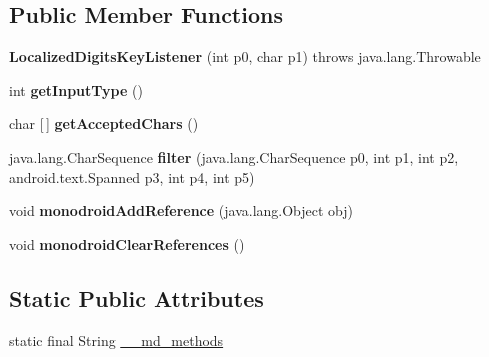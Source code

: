 \subsection*{Public Member Functions}
\begin{DoxyCompactItemize}
\item 
\mbox{\label{classmd5b60ffeb829f638581ab2bb9b1a7f4f3f_1_1LocalizedDigitsKeyListener_a6d87d28f4bbd94c7c2951d999a330b40}} 
{\bfseries Localized\+Digits\+Key\+Listener} (int p0, char p1)  throws java.\+lang.\+Throwable 	
\item 
\mbox{\label{classmd5b60ffeb829f638581ab2bb9b1a7f4f3f_1_1LocalizedDigitsKeyListener_ad2ee9df5ab9a58dc5587f8e51bc2ae86}} 
int {\bfseries get\+Input\+Type} ()
\item 
\mbox{\label{classmd5b60ffeb829f638581ab2bb9b1a7f4f3f_1_1LocalizedDigitsKeyListener_a7b55b3fb569ac307d24bb5e4bbe1edb4}} 
char \mbox{[}$\,$\mbox{]} {\bfseries get\+Accepted\+Chars} ()
\item 
\mbox{\label{classmd5b60ffeb829f638581ab2bb9b1a7f4f3f_1_1LocalizedDigitsKeyListener_a27713736596f0402b77820159014e506}} 
java.\+lang.\+Char\+Sequence {\bfseries filter} (java.\+lang.\+Char\+Sequence p0, int p1, int p2, android.\+text.\+Spanned p3, int p4, int p5)
\item 
\mbox{\label{classmd5b60ffeb829f638581ab2bb9b1a7f4f3f_1_1LocalizedDigitsKeyListener_aa59c658d0bc78ec1affdbe58599ce60e}} 
void {\bfseries monodroid\+Add\+Reference} (java.\+lang.\+Object obj)
\item 
\mbox{\label{classmd5b60ffeb829f638581ab2bb9b1a7f4f3f_1_1LocalizedDigitsKeyListener_a1cc96ff80d2ae18b0cfa194517fa6aa3}} 
void {\bfseries monodroid\+Clear\+References} ()
\end{DoxyCompactItemize}
\subsection*{Static Public Attributes}
\begin{DoxyCompactItemize}
\item 
static final String \hyperlink{classmd5b60ffeb829f638581ab2bb9b1a7f4f3f_1_1LocalizedDigitsKeyListener_ac9b095fc4313cfd1f41cf5978338382c}{\+\_\+\+\_\+md\+\_\+methods}
\end{DoxyCompactItemize}
